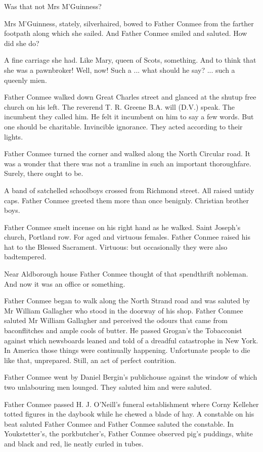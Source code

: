 Was that not Mrs M'Guinness?

Mrs M'Guinness, stately, silverhaired, bowed to Father Conmee from
the farther footpath along which she sailed. And Father Conmee smiled and
saluted. How did she do?

A fine carriage she had. Like Mary, queen of Scots, something. And to
think that she was a pawnbroker! Well, now! Such a ... what should he
say? ... such a queenly mien.

Father Conmee walked down Great Charles street and glanced at the
shutup free church on his left. The reverend T. R. Greene B.A. will (D.V.)
speak. The incumbent they called him. He felt it incumbent on him to say a
few words. But one should be charitable. Invincible ignorance. They acted
according to their lights.

Father Conmee turned the corner and walked along the North
Circular road. It was a wonder that there was not a tramline in such an
important thoroughfare. Surely, there ought to be.

A band of satchelled schoolboys crossed from Richmond street. All
raised untidy caps. Father Conmee greeted them more than once benignly.
Christian brother boys.

Father Conmee smelt incense on his right hand as he walked. Saint
Joseph's church, Portland row. For aged and virtuous females. Father
Conmee raised his hat to the Blessed Sacrament. Virtuous: but occasionally
they were also badtempered.

Near Aldborough house Father Conmee thought of that spendthrift
nobleman. And now it was an office or something.

Father Conmee began to walk along the North Strand road and was
saluted by Mr William Gallagher who stood in the doorway of his shop.
Father Conmee saluted Mr William Gallagher and perceived the odours
that came from baconflitches and ample cools of butter. He passed
Grogan's the Tobacconist against which newsboards leaned and told of a
dreadful catastrophe in New York. In America those things were
continually happening. Unfortunate people to die like that, unprepared.
Still, an act of perfect contrition.

Father Conmee went by Daniel Bergin's publichouse against the
window of which two unlabouring men lounged. They saluted him and
were saluted.

Father Conmee passed H. J. O'Neill's funeral establishment where
Corny Kelleher totted figures in the daybook while he chewed a blade of
hay. A constable on his beat saluted Father Conmee and Father Conmee
saluted the constable. In Youkstetter's, the porkbutcher's, Father Conmee
observed pig's puddings, white and black and red, lie neatly curled in
tubes.

